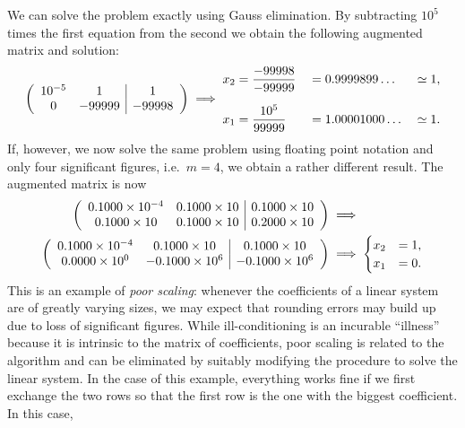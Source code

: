 We can solve the problem exactly using Gauss elimination.   By
subtracting $10^5$ times the first equation from the second  we obtain
the following augmented matrix and solution:
%
\begin{equation*}
  \left (
   \begin{array}{c c|c}
    10^{-5} & 1 & 1 \\
    0 & -99999 & -99998 
   \end{array}
  \right )
  \implies
  \begin{aligned}
    x_2 &=  \dfrac{-99998}{-99999} &&= 0.9999899\ldots && \simeq 1 , \\*[2mm]
    x_1 &=  \dfrac{10^5}{99999} &&= 1.00001000\ldots && \simeq 1 .
  \end{aligned}
\end{equation*}
%
If, however, we now solve the same problem using floating point
notation and only four significant figures, i.e.\ $m=4$, we obtain a
rather different result.    The augmented matrix is now
%
\begin{align}
   \left (
    \begin{array}{c c|c}
      0.1000 \times 10^{-4} & 0.1000 \times 10 & 0.1000 \times 10 \\
      0.1000 \times 10 & 0.1000 \times 10 & 0.2000 \times 10 
    \end{array}
  \right ) & \implies \\
   \left (
    \begin{array}{c c|c}
      0.1000 \times 10^{-4} & 0.1000 \times 10 & 0.1000 \times 10 \\
      0.0000 \times 10^{0} & -0.1000 \times 10^6 & -0.1000 \times 10^6 
    \end{array}
  \right ) & \implies
  \begin{cases}
    x_2 &= 1, \\ x_1 &= 0 .
  \end{cases}
\end{align}
%
This is an example of \textit{poor scaling}: whenever the coefficients
of a linear system are of greatly varying sizes, we may expect that
rounding errors may build up due to loss of significant figures.
While ill-conditioning is an incurable ``illness'' because it is
intrinsic to the matrix of coefficients, poor scaling is related
to the algorithm and can be eliminated by suitably modifying the
procedure to solve the linear system.     In the case of this example,
everything works fine if we first exchange the two rows so that the
first row is the one with the biggest coefficient.    In this case,
